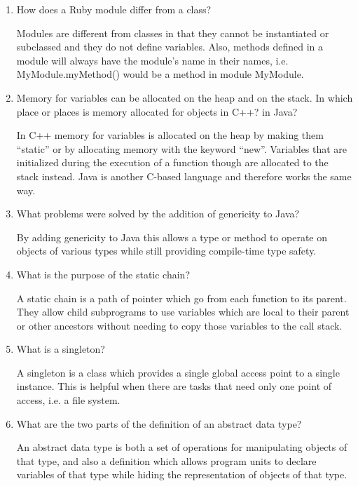 \begin{enumerate}
  \item How does a Ruby module differ from a class?

  \begin{answer}
    Modules are different from classes in that they cannot be instantiated or subclassed and they do not define variables. Also, methods defined in a module will always have the module's name in their names, i.e. MyModule.myMethod() would be a method in module MyModule.
  \end{answer}

  \item Memory for variables can be allocated on the heap
    and on the stack. In which place or places is memory
    allocated for objects in C++? in Java?

  \begin{answer}
    In C++ memory for variables is allocated on the heap by making them ``static'' or by allocating memory with the keyword ``new''. Variables that are initialized during the execution of a function though are allocated to the stack instead. Java is another C-based language and therefore works the same way.

  \end{answer}

  \item What problems were solved by the addition
    of genericity to Java?

  \begin{answer}
    By adding genericity to Java this allows a type or method to operate on objects of various types while still providing compile-time type safety.
  \end{answer}

  \item What is the purpose of the static chain?

  \begin{answer}
    A static chain is a path of pointer which go from each function to its parent. They allow child subprograms to use variables which are local to their parent or other ancestors without needing to copy those variables to the call stack.
  \end{answer}

  \item What is a singleton?

  \begin{answer}
    A singleton is a class which provides a single global access point to a single instance. This is helpful when there are tasks that need only one point of access, i.e. a file system.
  \end{answer}

  \item What are the two parts of the definition 
    of an abstract data type?

  \begin{answer}
    An abstract data type is both a set of operations for manipulating objects of that type, and also a definition which allows program units to declare variables of that type while hiding the representation of objects of that type.
  \end{answer}

  \end{enumerate}


